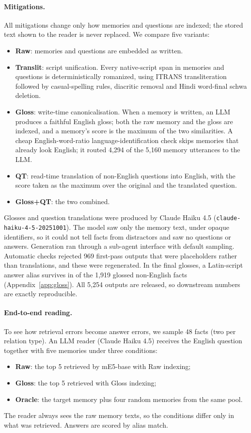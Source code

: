 \paragraph{Mitigations.}
All mitigations change only how memories and questions are indexed; the stored text shown to the reader is never replaced. We compare five variants:
\begin{itemize}
\item \textbf{Raw}: memories and questions are embedded as written.
\item \textbf{Translit}: script unification. Every native-script span in memories and questions is deterministically romanized, using ITRANS transliteration followed by casual-spelling rules, diacritic removal and Hindi word-final schwa deletion.
\item \textbf{Gloss}: write-time canonicalisation. When a memory is written, an LLM produces a faithful English gloss; both the raw memory and the gloss are indexed, and a memory's score is the maximum of the two similarities. A cheap English-word-ratio language-identification check skips memories that already look English; it routed 4{,}294 of the 5{,}160 memory utterances to the LLM.
\item \textbf{QT}: read-time translation of non-English questions into English, with the score taken as the maximum over the original and the translated question.
\item \textbf{Gloss+QT}: the two combined.
\end{itemize}

Glosses and question translations were produced by Claude Haiku 4.5 (\texttt{claude-haiku-4-5-20251001}). The model saw only the memory text, under opaque identifiers, so it could not tell facts from distractors and saw no questions or answers. Generation ran through a sub-agent interface with default sampling. Automatic checks rejected 969 first-pass outputs that were placeholders rather than translations, and these were regenerated. In the final glosses, a Latin-script answer alias survives in \glossKeep{} of the 1{,}919 glossed non-English facts (Appendix~\ref{app:gloss}). All 5{,}254 outputs are released, so downstream numbers are exactly reproducible.

\paragraph{End-to-end reading.}
To see how retrieval errors become answer errors, we sample 48 facts (two per relation type). An LLM reader (Claude Haiku 4.5) receives the English question together with five memories under three conditions:
\begin{itemize}
\item \textbf{Raw}: the top 5 retrieved by mE5-base with Raw indexing;
\item \textbf{Gloss}: the top 5 retrieved with Gloss indexing;
\item \textbf{Oracle}: the target memory plus four random memories from the same pool.
\end{itemize}
The reader always sees the raw memory texts, so the conditions differ only in what was retrieved. Answers are scored by alias match.
